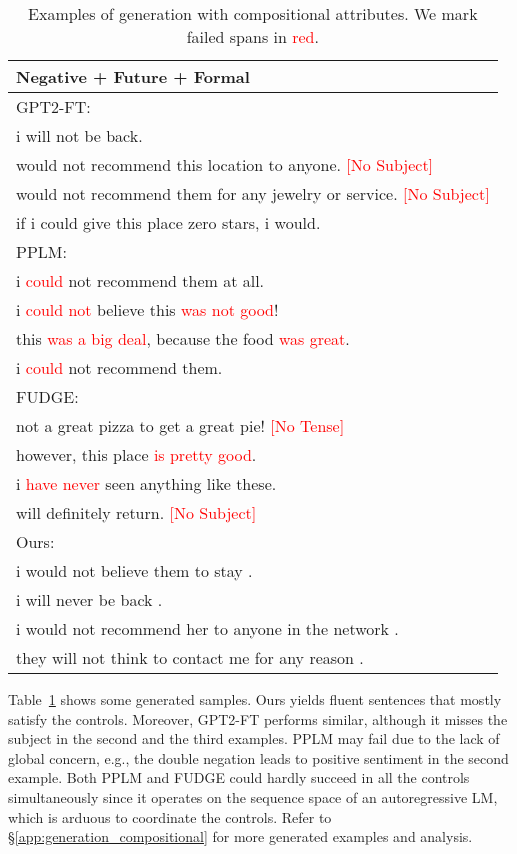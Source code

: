 \documentclass[11pt]{article}
\newcommand{\senc}[1]{\textcolor{red}{#1}}
\begin{document}
\begin{table}[t]
\centering
\scriptsize
\vspace{-15pt}
\begin{tabular}{m{}}
\toprule
\textbf{Negative + Future + Formal}\\
\midrule
GPT2-FT: \\
	\quad i will not be back.\\
	\quad would not recommend this location to anyone. \senc{[No Subject]}\\
	\quad would not recommend them for any jewelry or service. \senc{[No Subject]}\\
	\quad if i could give this place zero stars, i would.\\
	\midrule

PPLM:\\
	\quad i \senc{could} not recommend them at all.\\
	\quad i \senc{could not} believe this \senc{was not good}!\\
	\quad this \senc{was a big deal}, because the food \senc{was great}. \\
	\quad i \senc{could} not recommend them.\\
	\midrule

FUDGE:\\
    \quad not a great pizza to get a great pie! \senc{[No Tense]}\\
    \quad however, this place \senc{is pretty good}. \\
    \quad i \senc{have never} seen anything like these. \\
    \quad will definitely return. \senc{[No Subject]}\\
	\midrule

Ours:\\
	\quad i would not believe them to stay .\\
	\quad i will never be back .\\
	\quad i would not recommend her to anyone in the network .\\
	\quad they will not think to contact me for any reason .\\
	\bottomrule
\end{tabular}
\caption{Examples of generation with compositional attributes. 
We mark failed spans in \senc{red}.
}
\label{tab:examples_compositional}
\vspace{-10pt}
\end{table}

Table~\ref{tab:examples_compositional} shows some generated samples. Ours yields fluent sentences that mostly satisfy the controls. Moreover, GPT2-FT performs similar, although it misses the subject in the second and the third examples. PPLM may fail due to the lack of global concern, e.g., the double negation leads to positive sentiment in the second example. Both PPLM and FUDGE could hardly succeed in all the controls simultaneously since it operates on the sequence space of an autoregressive LM, which is arduous to coordinate the controls.
Refer to \S\ref{app:generation_compositional} for more generated examples and analysis.
\end{document}
